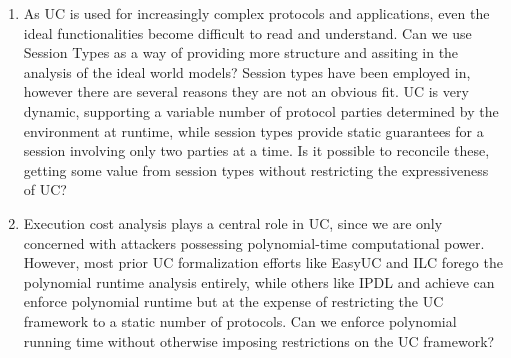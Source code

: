 \begin{enumerate}
\item 
As UC is used for increasingly complex protocols and applications, even the ideal functionalities become difficult to read and understand. Can we use Session Types as a way of providing more structure and assiting in the analysis of the ideal world models?
Session types have been employed in, however there are several reasons they are not an obvious fit.
UC is very dynamic, supporting a variable number of protocol parties determined by the environment at runtime, while session types provide static guarantees for a session involving only two parties at a time.
Is it possible to reconcile these, getting some value from session types without restricting the expressiveness of UC?

\item Execution cost analysis plays a central role in UC, since we are only concerned with
attackers possessing polynomial-time computational power.
However, most prior UC formalization efforts like EasyUC and ILC forego the polynomial runtime analysis entirely, while others like IPDL and achieve can enforce polynomial runtime but at the expense of restricting the UC framework to a static number of protocols.
Can we enforce polynomial running time without otherwise imposing restrictions on the UC framework?

\end{enumerate}

